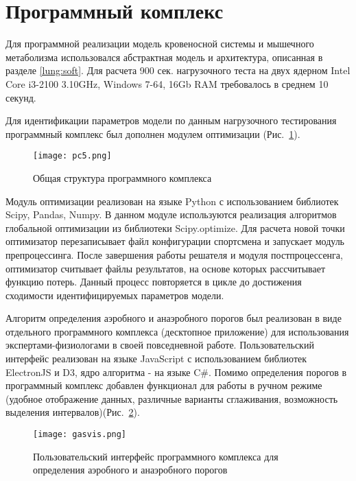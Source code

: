\section{Программный комплекс}
Для программной реализации модель кровеносной системы и мышечного метаболизма использовался абстрактная модель и архитектура, описанная в разделе \ref{lung:soft}. Для расчета 900 сек. нагрузочного теста на двух ядерном Intel Core i3-2100 3.10GHz, Windows 7-64, 16Gb RAM требовалось в среднем 10 секунд. 

Для идентификации параметров модели по данным нагрузочного тестирования программный комплекс был дополнен модулем оптимизации (Рис.~\ref{fig:soft_muscle}). 
\begin{figure}[!ht]
	\centering
	\texttt{[image: pc5.png]}
	\caption{Общая структура программного комплекса} 
	\label{fig:soft_muscle}
\end{figure}
Модуль оптимизации реализован на языке Python с использованием библиотек Scipy, Pandas, Numpy. В данном модуле используются реализация алгоритмов глобальной оптимизации из библиотеки Scipy.optimize. Для расчета новой точки оптимизатор перезаписывает файл конфигурации спортсмена и запускает модуль препроцессинга. После завершения работы решателя и модуля постпроцессенга, оптимизатор считывает файлы результатов, на основе которых рассчитывает функцию потерь. Данный процесс повторяется в цикле до достижения сходимости идентифицируемых параметров модели. 

Алгоритм определения аэробного и анаэробного порогов был реализован в виде отдельного программного комплекса (десктопное приложение) для использования экспертами-физиологами в своей  повседневной работе. Пользовательский интерфейс реализован на языке JavaScript с использованием библиотек ElectronJS и D3, ядро алгоритма - на языке C\#. Помимо определения порогов в программный комплекс добавлен функционал для работы в ручном режиме (удобное отображение данных, различные варианты сглаживания, возможность выделения интервалов)(Рис.~\ref{fig:soft_gasvis}). 
\begin{figure}[!ht]
	\centering
	\texttt{[image: gasvis.png]}
	\caption{Пользовательский интерфейс программного комплекса для определения аэробного и анаэробного порогов} 
	\label{fig:soft_gasvis}
\end{figure}

\clearpage
